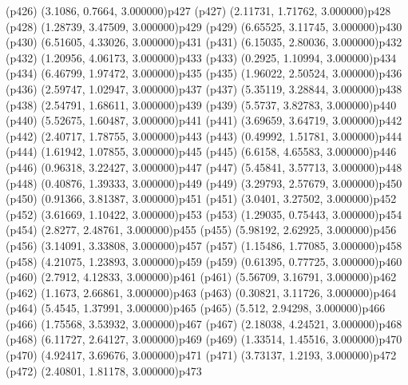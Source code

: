 \psdot(p426)
\psPoint(3.1086, 0.7664, 3.000000){p427}
\psdot(p427)
\psPoint(2.11731, 1.71762, 3.000000){p428}
\psdot(p428)
\psPoint(1.28739, 3.47509, 3.000000){p429}
\psdot(p429)
\psPoint(6.65525, 3.11745, 3.000000){p430}
\psdot(p430)
\psPoint(6.51605, 4.33026, 3.000000){p431}
\psdot(p431)
\psPoint(6.15035, 2.80036, 3.000000){p432}
\psdot(p432)
\psPoint(1.20956, 4.06173, 3.000000){p433}
\psdot(p433)
\psPoint(0.2925, 1.10994, 3.000000){p434}
\psdot(p434)
\psPoint(6.46799, 1.97472, 3.000000){p435}
\psdot(p435)
\psPoint(1.96022, 2.50524, 3.000000){p436}
\psdot(p436)
\psPoint(2.59747, 1.02947, 3.000000){p437}
\psdot(p437)
\psPoint(5.35119, 3.28844, 3.000000){p438}
\psdot(p438)
\psPoint(2.54791, 1.68611, 3.000000){p439}
\psdot(p439)
\psPoint(5.5737, 3.82783, 3.000000){p440}
\psdot(p440)
\psPoint(5.52675, 1.60487, 3.000000){p441}
\psdot(p441)
\psPoint(3.69659, 3.64719, 3.000000){p442}
\psdot(p442)
\psPoint(2.40717, 1.78755, 3.000000){p443}
\psdot(p443)
\psPoint(0.49992, 1.51781, 3.000000){p444}
\psdot(p444)
\psPoint(1.61942, 1.07855, 3.000000){p445}
\psdot(p445)
\psPoint(6.6158, 4.65583, 3.000000){p446}
\psdot(p446)
\psPoint(0.96318, 3.22427, 3.000000){p447}
\psdot(p447)
\psPoint(5.45841, 3.57713, 3.000000){p448}
\psdot(p448)
\psPoint(0.40876, 1.39333, 3.000000){p449}
\psdot(p449)
\psPoint(3.29793, 2.57679, 3.000000){p450}
\psdot(p450)
\psPoint(0.91366, 3.81387, 3.000000){p451}
\psdot(p451)
\psPoint(3.0401, 3.27502, 3.000000){p452}
\psdot(p452)
\psPoint(3.61669, 1.10422, 3.000000){p453}
\psdot(p453)
\psPoint(1.29035, 0.75443, 3.000000){p454}
\psdot(p454)
\psPoint(2.8277, 2.48761, 3.000000){p455}
\psdot(p455)
\psPoint(5.98192, 2.62925, 3.000000){p456}
\psdot(p456)
\psPoint(3.14091, 3.33808, 3.000000){p457}
\psdot(p457)
\psPoint(1.15486, 1.77085, 3.000000){p458}
\psdot(p458)
\psPoint(4.21075, 1.23893, 3.000000){p459}
\psdot(p459)
\psPoint(0.61395, 0.77725, 3.000000){p460}
\psdot(p460)
\psPoint(2.7912, 4.12833, 3.000000){p461}
\psdot(p461)
\psPoint(5.56709, 3.16791, 3.000000){p462}
\psdot(p462)
\psPoint(1.1673, 2.66861, 3.000000){p463}
\psdot(p463)
\psPoint(0.30821, 3.11726, 3.000000){p464}
\psdot(p464)
\psPoint(5.4545, 1.37991, 3.000000){p465}
\psdot(p465)
\psPoint(5.512, 2.94298, 3.000000){p466}
\psdot(p466)
\psPoint(1.75568, 3.53932, 3.000000){p467}
\psdot(p467)
\psPoint(2.18038, 4.24521, 3.000000){p468}
\psdot(p468)
\psPoint(6.11727, 2.64127, 3.000000){p469}
\psdot(p469)
\psPoint(1.33514, 1.45516, 3.000000){p470}
\psdot(p470)
\psPoint(4.92417, 3.69676, 3.000000){p471}
\psdot(p471)
\psPoint(3.73137, 1.2193, 3.000000){p472}
\psdot(p472)
\psPoint(2.40801, 1.81178, 3.000000){p473}
